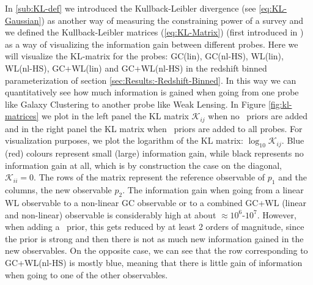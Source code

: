 In \cref{sub:KL-def} we introduced the Kullback-Leibler divergence (see \cref{eq:KL-Gaussian}) as another way of measuring 
the constraining power of a survey and we defined the Kullback-Leibler matrices (\cref{eq:KL-Matrix}) (first introduced in \cite{casas-MGforec}) as a way
of visualizing the information gain between different probes.
Here we will visualize the KL-matrix for the probes: GC(lin), GC(nl-HS), WL(lin), WL(nl-HS), GC+WL(lin) and GC+WL(nl-HS) in the redshift
binned parameterization of section \ref{sec:Results:-Redshift-Binned}.
In this way we can quantitatively see how much information is gained when going from one probe like Galaxy Clustering 
to another probe like Weak Lensing. 
In Figure \ref{fig:kl-matrices} we plot in the left panel the KL matrix $\mathcal{K}_{ij}$ when no \planck\ priors are added and 
in the right panel the KL matrix when \planck\ priors are added to all probes. 
For visualization purposes, 
we plot the logarithm of the KL matrix: $\log_{10} \mathcal{K}_{ij}$. 
Blue (red) colours represent small (large) information gain, while
black represents no information gain at all, which is by construction the case on the diagonal, $\mathcal{K}_{ii}=0$. 
The rows of the matrix represent the reference observable of $p_1$ and the columns,
the new observable $p_2$.
The information gain when going from a linear WL observable to a non-linear GC observable or to a combined GC+WL (linear and non-linear) 
observable is considerably high at about $\approx 10^6$-$10^7$. 
However, when adding a \planck\ prior, this gets reduced by at least 2 orders of magnitude, 
since the prior is strong and then there is not as much new information gained in the new observables. 
On the opposite case, we can see that the row corresponding to GC+WL(nl-HS) is mostly blue, 
meaning that there is little gain of information when going to one of the other observables.

